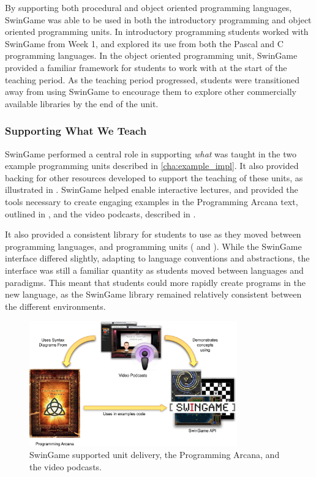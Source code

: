 By supporting both procedural and object oriented programming languages, SwinGame was able to be used in both the introductory programming and object oriented programming units. In introductory programming students worked with SwinGame from Week 1, and explored its use from both the Pascal and C programming languages. In the object oriented programming unit, SwinGame provided a familiar framework for students to work with at the start of the teaching period. As the teaching period progressed, students were transitioned away from using SwinGame to encourage them to explore other commercially available libraries by the end of the unit.

\subsubsection{Supporting What We Teach} %
\label{sub:supporting_what_we_teach}

SwinGame performed a central role in supporting \emph{what} was taught in the two example programming units described in \cref{cha:example_impl}. It also provided backing for other resources developed to support the teaching of these units, as illustrated in . SwinGame helped enable interactive lectures, and provided the tools necessary to create engaging examples in the Programming Arcana text, outlined in , and the video podcasts, described in . 

It also provided a consistent library for students to use as they moved between programming languages, and programming units ( and ). While the SwinGame interface differed slightly, adapting to language conventions and abstractions, the interface was still a familiar quantity as students moved between languages and paradigms. This meant that students could more rapidly create programs in the new language, as the SwinGame library remained relatively consistent between the different environments.

\begin{figure}[thb]
  \centering
  \includegraphics[width=0.8\textwidth]{SupportWhatWeTeach}
  \caption{SwinGame supported unit delivery, the Programming Arcana, and the video podcasts.}
  \label{fig:what_we_teach}
\end{figure}

